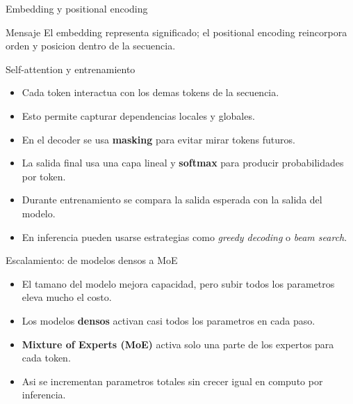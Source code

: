 \documentclass[aspectratio=169]{beamer}
\begin{document}
\begin{frame}{Embedding y positional encoding}
  \centering
  \vspace{0.25cm}

  \begin{block}{Mensaje}
    El embedding representa significado; el positional encoding reincorpora orden y posicion dentro de la secuencia.
  \end{block}
\end{frame}

\begin{frame}{Self-attention y entrenamiento}
  \begin{itemize}
    \item Cada token interactua con los demas tokens de la secuencia.
    \item Esto permite capturar dependencias locales y globales.
    \item En el decoder se usa \textbf{masking} para evitar mirar tokens futuros.
    \item La salida final usa una capa lineal y \textbf{softmax} para producir probabilidades por token.
  \end{itemize}
  \vspace{0.2cm}
  \begin{itemize}
    \item Durante entrenamiento se compara la salida esperada con la salida del modelo.
    \item En inferencia pueden usarse estrategias como \textit{greedy decoding} o \textit{beam search}.
  \end{itemize}
\end{frame}

\begin{frame}{Escalamiento: de modelos densos a MoE}
  \begin{itemize}
    \item El tamano del modelo mejora capacidad, pero subir todos los parametros eleva mucho el costo.
    \item Los modelos \textbf{densos} activan casi todos los parametros en cada paso.
    \item \textbf{Mixture of Experts (MoE)} activa solo una parte de los expertos para cada token.
    \item Asi se incrementan parametros totales sin crecer igual en computo por inferencia.
  \end{itemize}
\end{frame}
\end{document}
